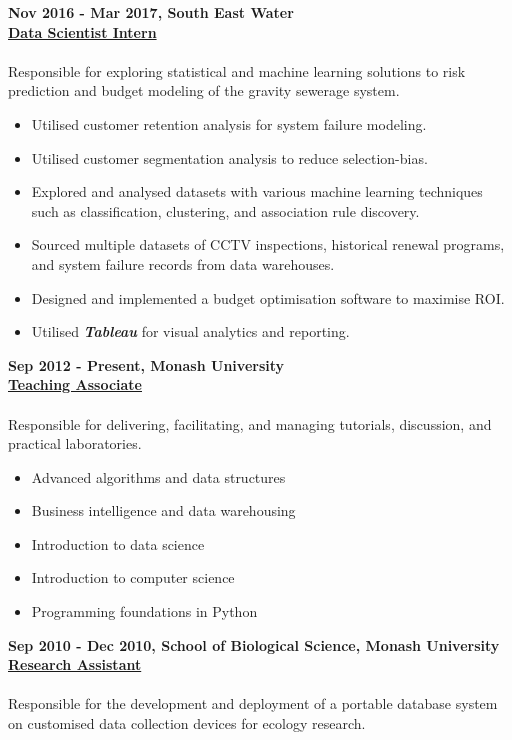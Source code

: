 \documentclass[a4paper,8pt,final]{memoir}
\newcommand{\Sep}{\vspace{1.5em}}
\newcommand{\CVItem}[1]
	{\textbf{\color{RoyalBlue} #1}}
\begin{document}
\CVItem{Nov 2016 - Mar 2017, South East Water}\\
\underline{\textbf{Data Scientist Intern}}\\
\\
Responsible for exploring statistical and machine learning solutions to risk prediction and budget modeling of the gravity sewerage system.
    \begin{itemize}
        \item Utilised customer retention analysis for system failure modeling.
        \item Utilised customer segmentation analysis to reduce selection-bias.
        \item Explored and analysed datasets with various machine learning techniques such as classification, clustering, and association rule discovery.
        \item Sourced multiple datasets of CCTV inspections, historical renewal programs, and system failure records from data warehouses.
        \item Designed and implemented a budget optimisation software to maximise ROI.
        \item Utilised \textit{\textbf{Tableau}} for visual analytics and reporting.
    \end{itemize}
\Sep

\clearpage
\framebreak
\framebreak

\CVItem{Sep 2012 - Present, Monash University}\\
\underline{\textbf{Teaching Associate}}\\
\\
Responsible for delivering, facilitating, and managing tutorials, discussion, and practical laboratories.
    \begin{itemize}
        \item Advanced algorithms and data structures
        \item Business intelligence and data warehousing
        \item Introduction to data science
        \item Introduction to computer science
        \item Programming foundations in Python
    \end{itemize}
\Sep

\CVItem{Sep 2010 - Dec 2010, School of Biological Science, Monash University}\\
\underline{\textbf{Research Assistant}}\\
\\
Responsible for the development and deployment of a portable database system on customised data collection devices for ecology research.
\Sep
\end{document}
